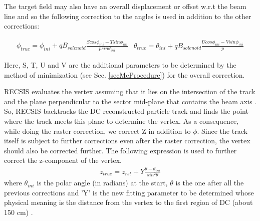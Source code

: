 
The target field may also have an overall displacement or offset w.r.t the beam line and so the following correction to
the angles is used in addition to the other corrections:

\begin{subequations}
\label{eqOffsetCor}
\begin{eqnarray}
\label{eqOffsetCor1}
\phi_{true} = \phi_{ini} + qB_{solenoid}\frac{S cos\phi_{ini} - T sin\phi_{ini}}{p sin\theta_{ini}}
\end{eqnarray}

\begin{eqnarray}
\label{eqOffsetCor2}
\theta_{true} = \theta_{ini} + qB_{solenoid} \frac{U cos\phi_{ini} - V sin\phi_{ini}}{p}
\end{eqnarray}
\end{subequations}

Here, S, T, U and V are the additional parameters to be determined by the method of \chisqs minimization (see Sec. \ref{secMcProcedure}) for the overall correction.









RECSIS evaluates the vertex assuming that it lies on the intersection of the track and the plane perpendicular to the 
sector mid-plane that contains the beam axis \cite{kuhnDvcs_wb}. So, RECSIS backtracks the DC-reconstructed particle track and finds the point where
the track meets this plane %
to determine the vertex. As a consequence, %
while doing the raster correction, we correct %
Z in addition to  $\phi$. Since the track itself is subject to further corrections even after the raster correction,
the vertex should also be corrected further. The following expression is used to further correct the z-component of the vertex.
\begin{eqnarray}
\label{eqExVzCor}
z_{true} = z_{rst} + Y \frac{\theta - \theta_{ini}}{sin^2\theta}
\end{eqnarray}
where $\theta_{ini}$ is the polar angle (in radians) at the start, $\theta$ is the one after all the previous corrections and 'Y' is the new fitting parameter to be determined whose physical meaning is the distance from the vertex to the first region of DC (about 150 cm) \cite{slava_th}.


















